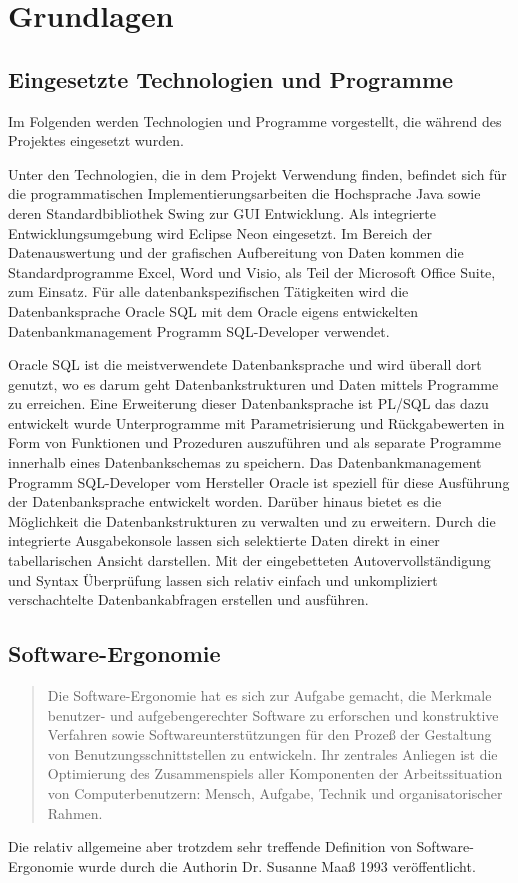 \section{Grundlagen}

\subsection{Eingesetzte Technologien und Programme}
Im Folgenden werden Technologien und Programme vorgestellt, die während des Projektes eingesetzt wurden.

Unter den Technologien, die in dem Projekt Verwendung finden, befindet sich für die programmatischen Implementierungsarbeiten die Hochsprache Java sowie deren Standardbibliothek Swing zur GUI Entwicklung. Als integrierte Entwicklungsumgebung wird Eclipse Neon eingesetzt. Im Bereich der Datenauswertung und der grafischen Aufbereitung von Daten kommen die Standardprogramme Excel, Word und Visio, als Teil der Microsoft Office Suite, zum Einsatz. Für alle datenbankspezifischen Tätigkeiten wird die Datenbanksprache Oracle SQL mit dem Oracle eigens entwickelten Datenbankmanagement Programm SQL-Developer verwendet.

Oracle SQL ist die meistverwendete Datenbanksprache und wird überall dort genutzt, wo es darum geht Datenbankstrukturen und Daten mittels Programme zu erreichen. Eine Erweiterung dieser Datenbanksprache ist PL/SQL das dazu entwickelt wurde Unterprogramme mit Parametrisierung und Rückgabewerten in Form von Funktionen und Prozeduren auszuführen und als separate Programme innerhalb eines Datenbankschemas zu speichern. Das Datenbankmanagement Programm SQL-Developer vom Hersteller Oracle ist speziell für diese Ausführung der Datenbanksprache entwickelt worden. Darüber hinaus bietet es die Möglichkeit die Datenbankstrukturen zu verwalten und zu erweitern. Durch die integrierte Ausgabekonsole lassen sich selektierte Daten direkt in einer tabellarischen Ansicht darstellen. Mit der eingebetteten Autovervollständigung und Syntax Überprüfung lassen sich relativ einfach und unkompliziert verschachtelte Datenbankabfragen erstellen und ausführen.

\subsection{Software-Ergonomie}
\begin{quote}
    Die Software-Ergonomie hat es sich zur Aufgabe gemacht, die Merkmale benutzer- und aufgebengerechter Software zu erforschen und konstruktive Verfahren sowie Softwareunterstützungen für den Prozeß der Gestaltung von Benutzungsschnittstellen zu entwickeln. Ihr zentrales Anliegen ist die Optimierung des Zusammenspiels aller Komponenten der Arbeitssituation von Computerbenutzern: Mensch, Aufgabe, Technik und organisatorischer Rahmen. \citep{Maass1993}
  \end{quote}
Die relativ allgemeine aber trotzdem sehr treffende Definition von Software-Ergonomie wurde durch die Authorin Dr. Susanne Maaß 1993 veröffentlicht.

